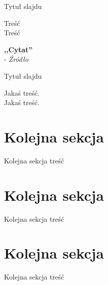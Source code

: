 \documentclass[11pt]{beamer}
\begin{document}
\begin{frame}{Tytuł slajdu}
\begin{small}
Treść \\

\vspace{3mm}
Treść
\vspace{3mm}

\textbf{,,Cytat''} \\- {\it Źródło}
\end{small}
\end{frame}

\begin{frame}{Tytuł slajdu}
\begin{small}
Jakaś treść. \\
\vspace{3mm}
Jakaś treść.
\end{small}
\end{frame}

\section{Kolejna sekcja}
\begin{frame}{Kolejna sekcja}
treść
\end{frame}
\section{Kolejna sekcja}
\begin{frame}{Kolejna sekcja}
treść
\end{frame}

\section{Kolejna sekcja}
\begin{frame}{Kolejna sekcja}
treść
\end{frame}
\end{document}
